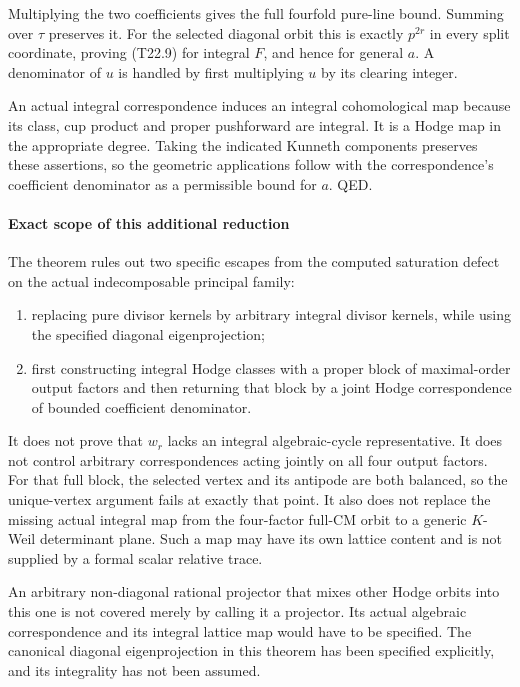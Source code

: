 \documentclass[11pt,a4paper]{article}
\providecommand{\tightlist}{\setlength{\itemsep}{0pt}\setlength{\parskip}{0pt}}
\theoremstyle{definition}
\begin{document}
Multiplying the two coefficients gives the full fourfold pure-line bound. Summing over \(\tau\) preserves it. For the selected diagonal orbit this is exactly \(p^{2r}\) in every split coordinate, proving (T22.9) for integral \(F\), and hence for general \(a\). A denominator of \(u\) is handled by first multiplying \(u\) by its clearing integer.

An actual integral correspondence induces an integral cohomological map because its class, cup product and proper pushforward are integral. It is a Hodge map in the appropriate degree. Taking the indicated Kunneth components preserves these assertions, so the geometric applications follow with the correspondence's coefficient denominator as a permissible bound for \(a\). QED.

\paragraph{Exact scope of this additional reduction}\label{exact-scope-of-this-additional-reduction}

The theorem rules out two specific escapes from the computed saturation defect on the actual indecomposable principal family:

\begin{enumerate}
\def\labelenumi{\arabic{enumi}.}
\tightlist
\item
  replacing pure divisor kernels by arbitrary integral divisor kernels, while using the specified diagonal eigenprojection;
\item
  first constructing integral Hodge classes with a proper block of maximal-order output factors and then returning that block by a joint Hodge correspondence of bounded coefficient denominator.
\end{enumerate}

It does not prove that \(w_r\) lacks an integral algebraic-cycle representative. It does not control arbitrary correspondences acting jointly on all four output factors. For that full block, the selected vertex and its antipode are both balanced, so the unique-vertex argument fails at exactly that point. It also does not replace the missing actual integral map from the four-factor full-CM orbit to a generic \(K\)-Weil determinant plane. Such a map may have its own lattice content and is not supplied by a formal scalar relative trace.

An arbitrary non-diagonal rational projector that mixes other Hodge orbits into this one is not covered merely by calling it a projector. Its actual algebraic correspondence and its integral lattice map would have to be specified. The canonical diagonal eigenprojection in this theorem has been specified explicitly, and its integrality has not been assumed.
\end{document}
